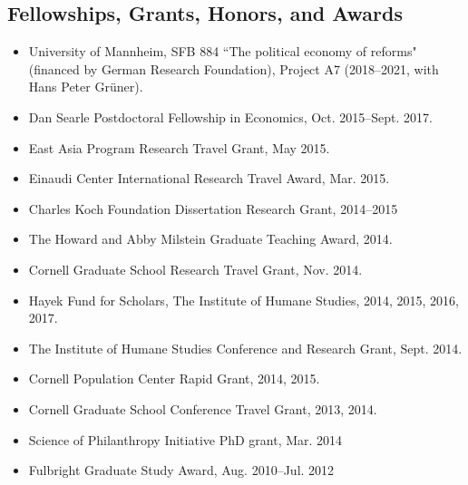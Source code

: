 \documentclass[margin, letterpaper]{res}
\begin{document}
\begin{resume}
\section{Fellowships, Grants, Honors, and Awards}
\begin{itemize}
\item University of Mannheim, SFB 884 ``The political economy of reforms" (financed by German Research Foundation), Project A7 (2018--2021, with Hans Peter Gr{\"u}ner).
\item Dan Searle Postdoctoral Fellowship in Economics, Oct. 2015--Sept. 2017.
\item East Asia Program Research Travel Grant, May 2015.
\item Einaudi Center International Research Travel Award, Mar. 2015.
\item Charles Koch Foundation Dissertation Research Grant, 2014--2015
\item The Howard and Abby Milstein Graduate Teaching Award, 2014.
\item Cornell Graduate School Research Travel Grant, Nov. 2014.
\item Hayek Fund for Scholars, The Institute of Humane Studies, 2014, 2015, 2016, 2017.
\item The Institute of Humane Studies Conference and Research Grant, Sept. 2014.
\item Cornell Population Center Rapid Grant, 2014, 2015.
\item Cornell Graduate School Conference Travel Grant, 2013, 2014.
\item Science of Philanthropy Initiative PhD grant, Mar. 2014
\item Fulbright Graduate Study Award, Aug. 2010--Jul. 2012
\end{itemize}


\end{resume}
\end{document}

